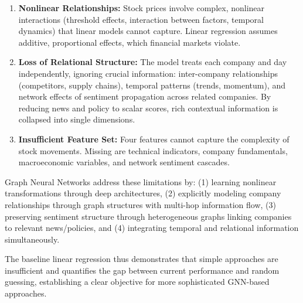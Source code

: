 \begin{enumerate}
    \item \textbf{Nonlinear Relationships:} Stock prices involve complex, nonlinear interactions (threshold effects, interaction between factors, temporal dynamics) that linear models cannot capture. Linear regression assumes additive, proportional effects, which financial markets violate.
    
    \item \textbf{Loss of Relational Structure:} The model treats each company and day independently, ignoring crucial information: inter-company relationships (competitors, supply chains), temporal patterns (trends, momentum), and network effects of sentiment propagation across related companies. By reducing news and policy to scalar scores, rich contextual information is collapsed into single dimensions.
    
    \item \textbf{Insufficient Feature Set:} Four features cannot capture the complexity of stock movements. Missing are technical indicators, company fundamentals, macroeconomic variables, and network sentiment cascades.
\end{enumerate}

Graph Neural Networks address these limitations by: (1) learning nonlinear transformations through deep architectures, (2) explicitly modeling company relationships through graph structures with multi-hop information flow, (3) preserving sentiment structure through heterogeneous graphs linking companies to relevant news/policies, and (4) integrating temporal and relational information simultaneously.

The baseline linear regression thus demonstrates that simple approaches are insufficient and quantifies the gap between current performance and random guessing, establishing a clear objective for more sophisticated GNN-based approaches.